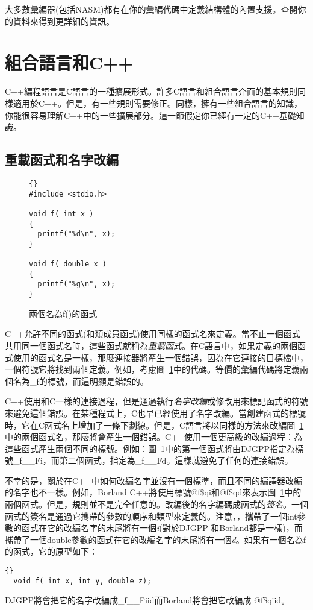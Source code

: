 大多數彙編器(包括NASM)都有在你的彙編代碼中定義結構體的內置支援。查閱你的資料來得到更詳細的資訊。



\section{組合語言和C++}

C++編程語言是C語言的一種擴展形式。許多C語言和組合語言介面的基本規則同樣適用於C++。但是，有一些規則需要修正。同樣，擁有一些組合語言的知識，你能很容易理解C++中的一些擴展部分。這一節假定你已經有一定的C++基礎知識。

\subsection{重載函式和名字改編}
\label{subsec:mangling}
\begin{figure}
\centering
\begin{lstlisting}[frame=tlrb]{}
#include <stdio.h>

void f( int x )
{
  printf("%d\n", x);
}

void f( double x )
{
  printf("%g\n", x);
}
\end{lstlisting}
\caption{兩個名為{\code f()}的函式\label{fig:twof}}
\end{figure}

C++允許不同的函式(和類成員函式)使用同樣的函式名來定義。當不止一個函式共用同一個函式名時，這些函式就稱為\emph{重載函式}。在C語言中，如果定義的兩個函式使用的函式名是一樣，那麼連接器將產生一個錯誤，因為在它連接的目標檔中，一個符號它將找到兩個定義。例如，考慮圖~\ref{fig:twof}中的代碼。等價的彙編代碼將定義兩個名為{\code \_f}的標號，而這明顯是錯誤的。

C++使用和C一樣的連接過程，但是通過執行\emph{名字改編}或修改用來標記函式的符號來避免這個錯誤。在某種程式上，C也早已經使用了名字改編。當創建函式的標號時，它在C函式名上增加了一條下劃線。但是，C語言將以同樣的方法來改編圖~\ref{fig:twof}中的兩個函式名，那麼將會產生一個錯誤。C++使用一個更高級的改編過程：為這些函式產生兩個不同的標號。例如：圖~\ref{fig:twof}中的第一個函式將由DJGPP指定為標號{\code \_f\_\_Fi}，而第二個函式，指定為{\code \_f\_\_Fd}。這樣就避免了任何的連接錯誤。

不幸的是，關於在C++中如何改編名字並沒有一個標準，而且不同的編譯器改編的名字也不一樣。例如，Borland C++將使用標號{\code @f\$qi}和{\code @f\$qd}來表示圖~\ref{fig:twof}中的兩個函式。但是，規則並不是完全任意的。改編後的名字編碼成函式的\emph{簽名}。一個函式的簽名是通過它攜帶的參數的順序和類型來定義的。注意，，攜帶了一個{\code int}參數的函式在它的改編名字的末尾將有一個\emph{i}(對於DJGPP 和Borland都是一樣)，而攜帶了一個{\code double}參數的函式在它的改編名字的末尾將有一個\emph{d}。如果有一個名為{\code f}的函式，它的原型如下：
\begin{lstlisting}[stepnumber=0]{}
  void f( int x, int y, double z);
\end{lstlisting}
\noindent DJGPP將會把它的名字改編成{\code \_f\_\_Fiid}而Borland將會把它改編成
{\code @f\$qiid}。

